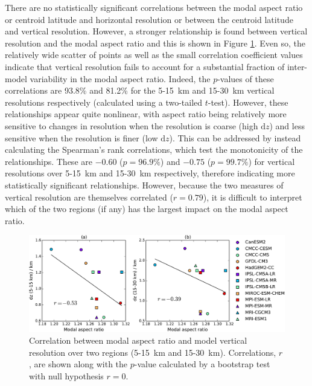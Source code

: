 There are no statistically significant correlations between the modal aspect
ratio or centroid latitude and horizontal resolution or between the centroid
latitude and vertical resolution. However, a stronger relationship is found
between vertical resolution and the modal aspect ratio and this is shown in
Figure \ref{fig:aspect_vert_res}. Even so, the relatively wide scatter of points
as well as the small correlation coefficient values indicate that vertical
resolution fails to account for a substantial fraction of inter-model
variability in the modal aspect ratio. Indeed, the $p$-values of these
correlations are 93.8\% and 81.2\% for the 5-15~km and 15-30~km vertical
resolutions respectively (calculated using a two-tailed $t$-test). However,
these relationships appear quite nonlinear, with aspect ratio being relatively
more sensitive to changes in resolution when the resolution is coarse (high
$\mathrm{d}z$) and less sensitive when the resolution is finer (low
$\mathrm{d}z$). This can be addressed by instead calculating the Spearman's rank
correlations, which test the monotonicity of the relationships. These are
$-0.60$ ($p=96.9\%$) and $-0.75$ ($p=99.7\%$) for vertical resolutions over
5-15~km and 15-30~km respectively, therefore indicating more statistically
significant relationships. However, because the two measures of vertical
resolution are themselves correlated ($r=0.79$), it is difficult to interpret
which of the two regions (if any) has the largest impact on the modal aspect
ratio.

\begin{figure}
 \centering
 \noindent\includegraphics[width=\textwidth]{figures/chapter-models/aspect_ratio_resolution.pdf}
 \caption[Vertical resolution and modal aspect ratio.]{Correlation between modal aspect ratio and
   model vertical resolution over two regions (5-15~km and
   15-30~km). Correlations, $r$, are shown along with the $p$-value calculated by a
   bootstrap test with null hypothesis $r=0$.}
 \label{fig:aspect_vert_res}
\end{figure}

